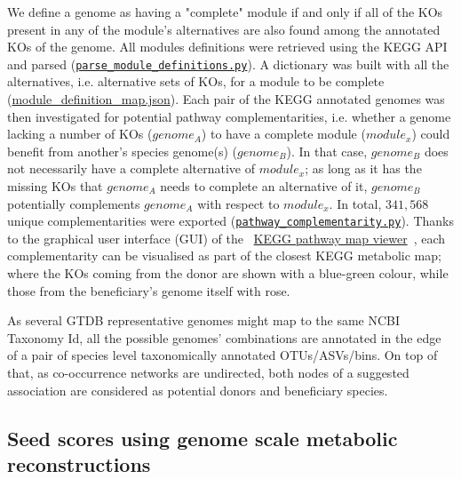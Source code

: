 \documentclass[sn-mathphys,Numbered]{sn-jnl}%
\theoremstyle{thmstyleone}%
\theoremstyle{thmstyletwo}%
\theoremstyle{thmstylethree}%
\begin{document}
        We define a genome as having a "complete" module if and only if all of the KOs present in any of the module's alternatives are also found among the annotated KOs of the genome.
        All modules definitions were retrieved using the KEGG API and parsed 
        (\href{https://github.com/hariszaf/microbetag/blob/develop/microbetagDB/mappings/kegg_mappings/parse_module_definitions.py}{\texttt{parse\_module\_definitions.py}}).
        A dictionary was built with all the alternatives, i.e. alternative sets of KOs, for a module to be complete 
        (\href{https://github.com/hariszaf/microbetag/blob/develop/microbetagDB/mappings/kegg_mappings/module_definition_map.json}{module\_definition\_map.json}).
        Each pair of the KEGG annotated genomes was then investigated for potential pathway complementarities, 
        i.e. whether a genome lacking a number of KOs ($genome_A$) to have a complete module ($module_x$) could benefit from another's species genome(s) ($genome_B$).
        In that case, $genome_B$ does not necessarily have a complete alternative of $module_x$; as long as it has the missing KOs that $genome_A$ needs to complete an alternative of it, $genome_B$ potentially complements $genome_A$ with respect to $module_x$.
        In total, $341,568$ unique complementarities were exported (\href{https://github.com/hariszaf/microbetag/blob/develop/microbetagDB/scripts/pathway_complementarity.py}{\texttt{pathway\_complementarity.py}}).
        Thanks to the graphical user interface (GUI) of the ~\href{https://www.kegg.jp/kegg/docs/color_gui.html}{KEGG pathway map viewer}~\cite{kanehisa2020kegg,kanehisa2022kegg}, 
        each complementarity can be visualised as part of the closest KEGG metabolic map; 
        where the KOs coming from the donor are shown with a blue-green colour, while those from the beneficiary's genome itself with rose.

        As several GTDB representative genomes might map to the same NCBI Taxonomy Id, all the possible genomes' combinations are annotated in the edge of a pair of species level taxonomically annotated OTUs/ASVs/bins.
        On top of that, as co-occurrence networks are undirected, both nodes of a suggested association are considered as potential donors and beneficiary species. 
        
        


    \subsection*{ Seed scores using genome scale metabolic reconstructions }
        \label{subsec:seeds}
\end{document}
